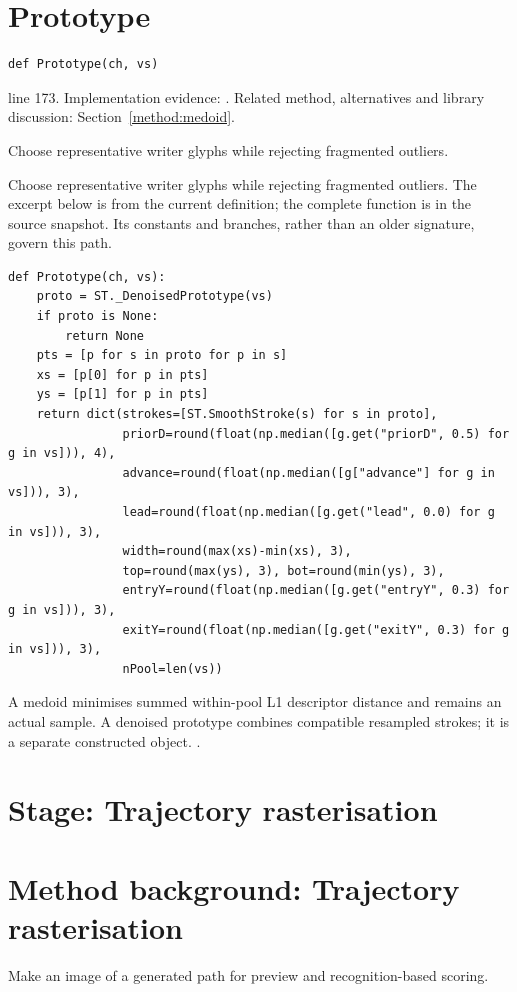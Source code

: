 \section{Prototype}\label{fn:curate:Prototype}
\begin{lstlisting}[style=sig]
def Prototype(ch, vs)
\end{lstlisting}
 line 173. Implementation evidence: \cite{code2026}. Related method, alternatives and library discussion: Section~\ref{method:medoid}.


Choose representative writer glyphs while rejecting fragmented outliers.


Choose representative writer glyphs while rejecting fragmented outliers. The excerpt below is from the current definition; the complete function is in the source snapshot. Its constants and branches, rather than an older signature, govern this path.


\begin{lstlisting}[style=plain]
def Prototype(ch, vs):
    proto = ST._DenoisedPrototype(vs)
    if proto is None:
        return None
    pts = [p for s in proto for p in s]
    xs = [p[0] for p in pts]
    ys = [p[1] for p in pts]
    return dict(strokes=[ST.SmoothStroke(s) for s in proto],
                priorD=round(float(np.median([g.get("priorD", 0.5) for g in vs])), 4),
                advance=round(float(np.median([g["advance"] for g in vs])), 3),
                lead=round(float(np.median([g.get("lead", 0.0) for g in vs])), 3),
                width=round(max(xs)-min(xs), 3),
                top=round(max(ys), 3), bot=round(min(ys), 3),
                entryY=round(float(np.median([g.get("entryY", 0.3) for g in vs])), 3),
                exitY=round(float(np.median([g.get("exitY", 0.3) for g in vs])), 3),
                nPool=len(vs))
\end{lstlisting}
A medoid minimises summed within-pool L1 descriptor distance and remains an actual sample. A denoised prototype combines compatible resampled strokes; it is a separate constructed object. \cite{code2026,haines2016}.


\section*{Stage: Trajectory rasterisation}
\section{Method background: Trajectory rasterisation}\label{method:render}
Make an image of a generated path for preview and recognition-based scoring.


